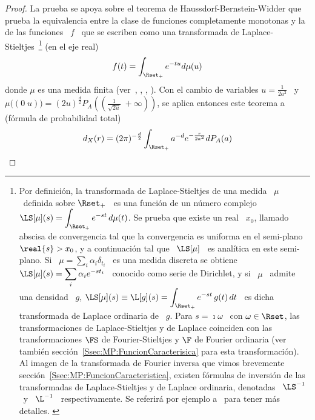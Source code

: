 \begin{proof}
  La prueba se  apoya sobre el teorema de  Haussdorf-Bernstein-Widder que prueba
  la equivalencia  entre la clase de  funciones completamente monotonas  y la de
  las   funciones  \  $f$   \  que   se  escriben   como  una   transformada  de
  Laplace-Stieltjes~\footnote{Por     definici\'on,    la     transformada    de
    Laplace-Stieltjes de una medida \ $\mu$  \ definida sobre $\Rset_+$ \ es una
    funci\'on   de  un   n\'umero  complejo   \  $\displaystyle   \LS[\mu](s)  =
    \int_{\Rset_+} e^{-s t}  \, d\mu(t)$. Se prueba que existe  un real \ $x_0$,
    llamado abscisa  de convergencia tal que  la convergencia es  uniforma en el
    semi-plano \ $\real{s}  > x_0$, y a continuaci\'on  tal que \ $\displaystyle
    \LS[\mu]$ \  es anal\'itica en este  semi-plano.  Si \  $\displaystyle \mu =
    \sum_i  \alpha_i  \delta_{t_i}$  \  es  una medida  discreta  se  obtiene  \
    $\displaystyle  \LS[\mu](s) = \sum_i  \alpha_i e^{-s  t_i}$ \  conocido como
    serie de Dirichlet, y si \ $\mu$ \ admite una densidad \ $g$, $\displaystyle
    \LS[\mu](s) \equiv  \L[g](s) = \int_{\Rset_+} e^{-s  t} \, g(t) \,  dt$ \ es
    dicha transformada de Laplace ordinaria de  \ $g$.  Para $s = \imath \omega$
    \ con  $\omega \in  \Rset$, las transformaciones  de Laplace-Stieltjes  y de
    Laplace coinciden con las transformaciones $\FS$ de Fourier-Stieltjes y $\F$
    de           Fourier            ordinaria           (ver           tambi\'en
    secci\'on~\ref{Ssec:MP:FuncionCaracterisica} para esta transformaci\'on). Al
    imagen  de   la  transformada  de  Fourier  inversa   que  vimos  brevemente
    secci\'on~\ref{Ssec:MP:FuncionCaracteristica},    existen    f\'ormulas   de
    inversi\'on  de   las  transformadas  de  Laplace-Stieltjes   y  de  Laplace
    ordinaria, denotadas  \ $\LS^{-1}$  \ y \  $\L^{-1}$ \  respectivamente.  Se
    referir\'a     por    ejemplo     a~\cite{Wid46}     para    tener     m\'as
    detalles. \label{Foot:MP:LaplaceStieltjes}} (en el eje real)
  \[
  f(t) = \int_{\Rset_+} e^{-t u} d\mu(u)
  \]
  donde  $\mu$  es  una  medida finita  (ver~\cite[Teo.~3]{Sch38},  \cite{Ber29,
    Haus21:I, Haus21:II,  Wid32}, \cite[\S~12]{Wid46}, \cite[\S~XIII.4]{Fel71}).
  Con el  cambio de variables  $u = \frac{1}{2  a^2}$ \ y  \ $\mu\big( (0  \; u)
  \big) =  (2 u)^{\frac{d}{2}} P_A\left( \left( \frac{1}{\sqrt{2  u}} \; +\infty
    \right) \right)$, se aplica entonces este teorema a (f\'ormula de probabilidad
  total)
  \[
  d_X(r)  =  (2 \pi)^{-\frac{d}{2}} \int_{\Rset_+} a^{-d} e^{-\frac{r}{2 a^2}} dP_A(a) 
  \]


\end{proof}
